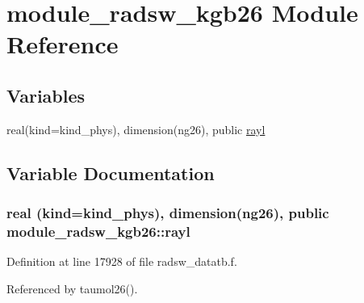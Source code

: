 \hypertarget{namespacemodule__radsw__kgb26}{}\section{module\+\_\+radsw\+\_\+kgb26 Module Reference}
\label{namespacemodule__radsw__kgb26}
\subsection*{Variables}
\begin{DoxyCompactItemize}
\item 
real(kind=kind\+\_\+phys), dimension(ng26), public \hyperlink{namespacemodule__radsw__kgb26_ab090be57484d2c5b67dda3d83c1c542b}{rayl}
\end{DoxyCompactItemize}


\subsection{Variable Documentation}
\subsubsection[{\texorpdfstring{rayl}{rayl}}]{\setlength{\rightskip}{0pt plus 5cm}real (kind=kind\+\_\+phys), dimension(ng26), public module\+\_\+radsw\+\_\+kgb26\+::rayl}\hypertarget{namespacemodule__radsw__kgb26_ab090be57484d2c5b67dda3d83c1c542b}{}\label{namespacemodule__radsw__kgb26_ab090be57484d2c5b67dda3d83c1c542b}


Definition at line 17928 of file radsw\+\_\+datatb.\+f.



Referenced by taumol26().

